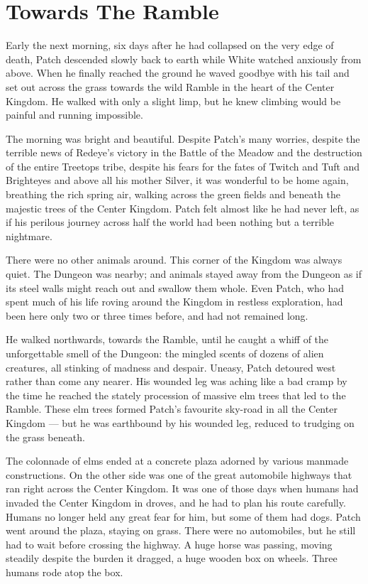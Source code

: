 \documentclass[ebook,oneside,openany,17pt]{memoir}
\newenvironment{tolerant}[1]{%
  \par\tolerance=#1\relax
}{%
  \par
}
\renewcommand{\thechapter}{\Roman{chapter}}
\newcounter{sections}
\newcommand{\sections}[1]{%
  \section*{#1}
  \addtocounter{sections}{1}%
  \pdfbookmark[1]{#1}{section.\thechapter.\thesections}}
\begin{document}

\sections{Towards The Ramble}

Early the next morning, six days after he had collapsed on the very
edge of death, Patch descended slowly back to earth while White
watched anxiously from above. When he finally reached the ground he
waved goodbye with his tail and set out across the grass towards the
wild Ramble in the heart of the Center Kingdom. He walked with only a
slight limp, but he knew climbing would be painful and running
impossible.

The morning was bright and beautiful. Despite Patch’s many worries,
despite the terrible news of Redeye’s victory in the Battle of the
Meadow and the destruction of the entire Treetops tribe, despite his
fears for the fates of Twitch and Tuft and Brighteyes and above all
his mother Silver, it was wonderful to be home again, breathing the
rich spring air, walking across the green fields and beneath the
majestic trees of the Center Kingdom. Patch felt almost like he had
never left, as if his perilous journey across half the world had been
nothing but a terrible nightmare.

There were no other animals around. This corner of the Kingdom was
always quiet. The Dungeon was nearby; and animals stayed away from the
Dungeon as if its steel walls might reach out and swallow them
whole. Even Patch, who had spent much of his life roving around the
Kingdom in restless exploration, had been here only two or three times
before, and had not remained long.

\begin{tolerant}{1000}
He walked northwards, towards the Ramble, until he caught a whiff of
the unforgettable smell of the Dungeon: the mingled scents of dozens
of alien creatures, all stinking of madness and despair. Uneasy, Patch
detoured west rather than come any nearer. His wounded leg was aching
like a bad cramp by the time he reached the stately procession of
massive elm trees that led to the Ramble. These elm trees formed
Patch’s favourite sky-road in all the Center Kingdom — but he was
earthbound by his wounded leg, reduced to trudging on the grass
beneath.
\end{tolerant}

The colonnade of elms ended at a concrete plaza adorned by various
manmade constructions. On the other side was one of the great
automobile highways that ran right across the Center Kingdom. It was
one of those days when humans had invaded the Center Kingdom in
droves, and he had to plan his route carefully. Humans no longer held
any great fear for him, but some of them had dogs. Patch went around
the plaza, staying on grass. There were no automobiles, but he still
had to wait before crossing the highway. A huge horse was passing,
moving steadily despite the burden it dragged, a huge wooden box on
wheels. Three humans rode atop the box.
\end{document}

